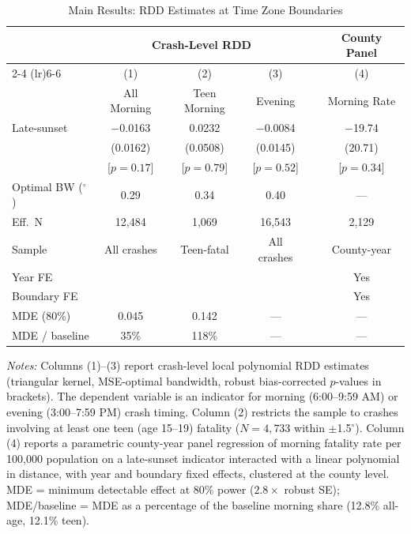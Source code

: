 \begin{table}[htbp]
\centering
\caption{Main Results: RDD Estimates at Time Zone Boundaries}
\label{tab:main}
\begin{threeparttable}
\begin{tabular}{lccccc}
\toprule
 & \multicolumn{3}{c}{Crash-Level RDD} & & County Panel \\
\cmidrule(lr){2-4} \cmidrule(lr){6-6}
 & (1) & (2) & (3) & & (4) \\
 & All Morning & Teen Morning & Evening & & Morning Rate \\
\midrule
Late-sunset & $-$0.0163 & 0.0232 & $-$0.0084 & & $-$19.74 \\
 & (0.0162) & (0.0508) & (0.0145) & & (20.71) \\
 & [$p = 0.17$] & [$p = 0.79$] & [$p = 0.52$] & & [$p = 0.34$] \\
\addlinespace
Optimal BW ($^\circ$) & 0.29 & 0.34 & 0.40 & & --- \\
Eff.\ N & 12,484 & 1,069 & 16,543 & & 2,129 \\
Sample & All crashes & Teen-fatal & All crashes & & County-year \\
Year FE & & & & & Yes \\
Boundary FE & & & & & Yes \\
\addlinespace
MDE (80\%) & 0.045 & 0.142 & --- & & --- \\
MDE / baseline & 35\% & 118\% & --- & & --- \\
\bottomrule
\end{tabular}
\begin{tablenotes}[flushleft]\small
\item \textit{Notes:} Columns (1)--(3) report crash-level local polynomial RDD estimates (triangular kernel, MSE-optimal bandwidth, robust bias-corrected $p$-values in brackets). The dependent variable is an indicator for morning (6:00--9:59 AM) or evening (3:00--7:59 PM) crash timing. Column (2) restricts the sample to crashes involving at least one teen (age 15--19) fatality ($N = 4{,}733$ within $\pm$1.5$^\circ$). Column (4) reports a parametric county-year panel regression of morning fatality rate per 100,000 population on a late-sunset indicator interacted with a linear polynomial in distance, with year and boundary fixed effects, clustered at the county level. MDE = minimum detectable effect at 80\% power ($2.8 \times$ robust SE); MDE/baseline = MDE as a percentage of the baseline morning share (12.8\% all-age, 12.1\% teen).
\end{tablenotes}
\end{threeparttable}
\end{table}
